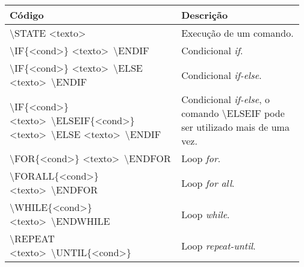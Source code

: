 % 
% 
% 
% 
% 
\begin{tabular}{p{0.57\linewidth}p{0.4\linewidth}}
    \hline
    Código & Descrição \\ \hline
    \textbackslash\textsf{STATE} \textless\textsf{texto}\textgreater & Execução de um comando. \\
    \textbackslash\textsf{IF}\{\textless\textsf{cond}\textgreater\} \textless\textsf{texto}\textgreater \ \textbackslash\textsf{ENDIF} & Condicional \textit{if}. \\
    \textbackslash\textsf{IF}\{\textless\textsf{cond}\textgreater\} \textless\textsf{texto}\textgreater \ \textbackslash\textsf{ELSE} \textless\textsf{texto}\textgreater \ \textbackslash\textsf{ENDIF} & Condicional \textit{if-else}. \\
    \textbackslash\textsf{IF}\{\textless\textsf{cond}\textgreater\} \textless\textsf{texto}\textgreater \ \textbackslash\textsf{ELSEIF}\{\textless\textsf{cond}\textgreater\} \textless\textsf{texto}\textgreater \ \textbackslash\textsf{ELSE} \textless\textsf{texto}\textgreater \ \textbackslash\textsf{ENDIF} & Condicional \textit{if-else}, o comando \textbackslash\textsf{ELSEIF} pode ser utilizado mais de uma vez. \\
    \textbackslash\textsf{FOR}\{\textless\textsf{cond}\textgreater\} \textless\textsf{texto}\textgreater \ \textbackslash\textsf{ENDFOR} & Loop \textit{for}. \\
    \textbackslash\textsf{FORALL}\{\textless\textsf{cond}\textgreater\} \textless\textsf{texto}\textgreater \ \textbackslash\textsf{ENDFOR} & Loop \textit{for all}. \\
    \textbackslash\textsf{WHILE}\{\textless\textsf{cond}\textgreater\} \textless\textsf{texto}\textgreater \ \textbackslash\textsf{ENDWHILE} & Loop \textit{while}. \\
    \textbackslash\textsf{REPEAT} \textless\textsf{texto}\textgreater \ \textbackslash\textsf{UNTIL}\{\textless\textsf{cond}\textgreater\}  & Loop \textit{repeat-until}. \\

\end{tabular}
